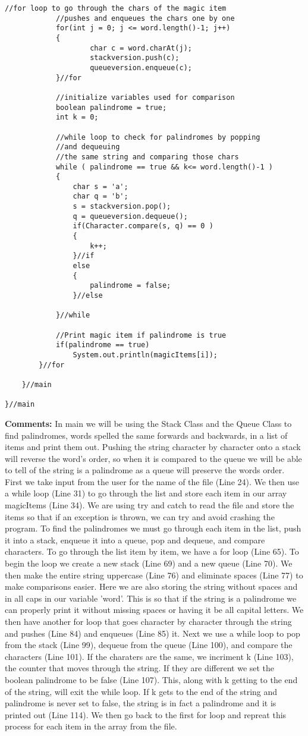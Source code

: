 \documentclass{article}
\begin{document}
\begin{lstlisting}[frame = single,
backgroundcolor = \color{grey!12}]
			//for loop to go through the chars of the magic item
			//pushes and enqueues the chars one by one
			for(int j = 0; j <= word.length()-1; j++)
			{
					char c = word.charAt(j);
					stackversion.push(c);
					queueversion.enqueue(c);	
			}//for
			
			//initialize variables used for comparison 
			boolean palindrome = true;
			int k = 0;
			
			//while loop to check for palindromes by popping 
			//and dequeuing 
			//the same string and comparing those chars
			while ( palindrome == true && k<= word.length()-1 )
			{
				char s = 'a';
				char q = 'b';
				s = stackversion.pop();
				q = queueversion.dequeue();
				if(Character.compare(s, q) == 0 ) 
				{
					k++;
				}//if		
				else
				{
					palindrome = false;
				}//else
					
			}//while
			
			//Print magic item if palindrome is true
			if(palindrome == true)
				System.out.println(magicItems[i]);
		}//for
		
	}//main

}//main
\end{lstlisting}
\textbf{Comments:}
In main we will be using the Stack Class and the Queue Class to find palindromes, words spelled the same forwards and backwards, in a list of items and print them out. Pushing the string character by character onto a stack will reverse the word's order, so when it is compared to the queue we will be able to tell of the string is a palindrome as a queue will preserve the words order. First we take input from the user for the name of the file (Line 24). We then use a while loop (Line 31) to go through the list and store each item in our array magicItems (Line 34). We are using try and catch to read the file and store the items so that if an exception is thrown, we can try and avoid crashing the program. To find the palindromes we must go through each item in the list, push it into a stack, enqueue it into a queue, pop and dequeue, and compare characters. To go through the list item by item, we have a for loop (Line 65). To begin the loop we create a new stack (Line 69) and a new queue (Line 70). We then make the entire string uppercase (Line 76) and eliminate spaces (Line 77) to make comparisons easier. Here we are also storing the string without spaces and in all caps in our variable 'word'. This is so that if the string is a palindrome we can properly print it without missing spaces or having it  be all capital letters. We then have another for loop that goes character by character through the string and pushes (Line 84) and enqueues (Line 85) it. Next we use a while loop to pop from the stack (Line 99), dequeue from the queue (Line 100), and compare the characters (Line 101). If the charaters are the same, we incriment k (Line 103), the counter that moves through the string. If they are different we set the boolean palindrome to be false (Line 107). This, along with k getting to the end of the string, will exit the while loop. If k gets to the end of the string and palindrome is never set to false, the string is in fact a palindrome and it is printed out (Line 114). We then go back to the first for loop and repreat this process for each item in the array from the file. 
\end{document}
